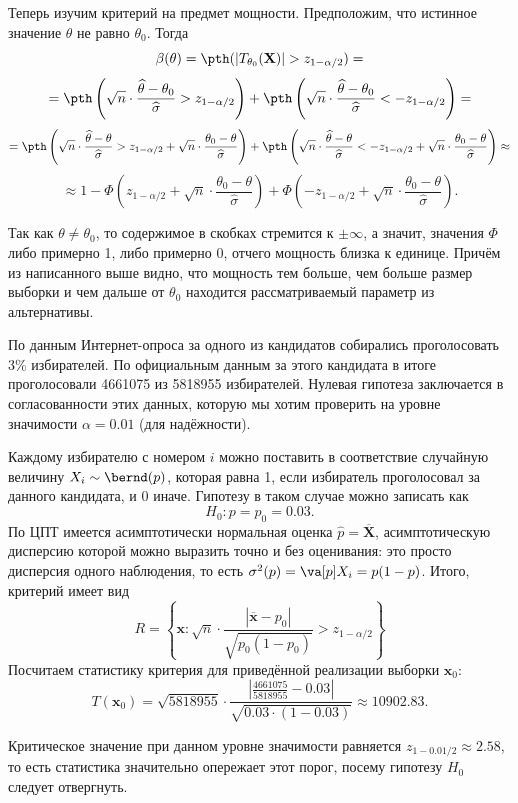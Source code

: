 Теперь изучим критерий на предмет мощности. Предположим, что истинное значение $\theta$ не равно $\theta_0$. Тогда
\[
    \beta(\theta) = \pth(|T_{\theta_0}(\mathbf X)| > z_{1 - \alpha/2}) =
\]
\[
    =\pth\left(\sqrt{n} \cdot \frac{\widehat{\theta} - \theta_0}{\widehat{\sigma}} > z_{1 - \alpha/2}\right) + \pth\left(\sqrt{n} \cdot \frac{\widehat{\theta} - \theta_0}{\widehat{\sigma}} < - z_{1 - \alpha/2}\right) =
\]
\[
    = \pth\left(\sqrt{n} \cdot \frac{\widehat{\theta} - \theta}{\widehat{\sigma}} > z_{1 - \alpha/2} + \sqrt{n} \cdot \frac{\theta_0 - \theta}{\widehat{\sigma}}\right) + \pth\left(\sqrt{n} \cdot \frac{\widehat{\theta} - \theta}{\widehat{\sigma}} < - z_{1 - \alpha/2} + \sqrt{n} \cdot \frac{\theta_0 - \theta}{\widehat{\sigma}}\right) \approx
\]
\[
    \approx 1 - \Phi\left(z_{1 - \alpha/2} + \sqrt{n} \cdot \frac{\theta_0 - \theta}{\widehat{\sigma}}\right) + \Phi\left(- z_{1 - \alpha/2} + \sqrt{n} \cdot \frac{\theta_0 - \theta}{\widehat{\sigma}}\right).
\]

Так как $\theta \ne \theta_0$, то содержимое в скобках стремится к $\pm \infty$, а значит, значения $\Phi$ либо примерно 1, либо примерно 0, отчего мощность близка к единице. Причём из написанного выше видно, что мощность тем больше, чем больше размер выборки и чем дальше от $\theta_0$ находится рассматриваемый параметр из альтернативы.

\begin{example}\label{small_p_value}
По данным Интернет-опроса за одного из кандидатов собирались проголосовать 3\% избирателей. По официальным данным за этого кандидата в итоге проголосовали 4661075 из 5818955 избирателей. Нулевая гипотеза заключается в согласованности этих данных, которую мы хотим проверить на уровне значимости $\alpha = 0.01$ (для надёжности).

Каждому избирателю с номером $i$ можно поставить в соответствие случайную величину $X_i \sim \bernd(p)$, которая равна 1, если избиратель проголосовал за данного кандидата, и 0 иначе. Гипотезу в таком случае можно записать как
\[
H_0\colon p = p_0 = 0.03.
\]
По ЦПТ имеется асимптотически нормальная оценка $\widehat{p} = \overline{\mathbf X}$, асимптотическую дисперсию которой можно выразить точно и без оценивания: это просто дисперсия одного наблюдения, то есть $\sigma^2(p) = \va[p] X_i = p(1 - p)$. Итого, критерий имеет вид
    \[
    R = \left\{\mathbf{x}\colon \sqrt{n} \cdot \frac{|\overline{\mathbf{x}} - p_0|}{\sqrt{p_0(1-p_0)}} > z_{1-\alpha/2}\right\}
    \]
    Посчитаем статистику критерия для приведённой реализации выборки $\mathbf x_0$:
    \[
    T(\mathbf x_0) = \sqrt{5818955} \cdot \frac{\left|\frac{4661075}{5818955} - 0.03\right|}{\sqrt{0.03 \cdot(1-0.03)}} \approx 10902.83.
    \]

    Критическое значение при данном уровне значимости равняется $z_{1 - 0.01/2} \approx 2.58$, то есть статистика значительно опережает этот порог, посему гипотезу $H_0$ следует отвергнуть. 
\end{example}

